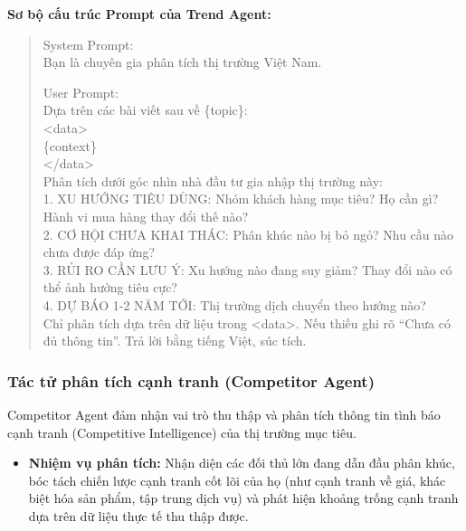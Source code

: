\documentclass[11pt,a4paper]{article}
\begin{document}
\begin{itemize}
\noindent\textbf{Sơ bộ cấu trúc Prompt của Trend Agent:}
\begin{quote}
\footnotesize\ttfamily
System Prompt:\\
Bạn là chuyên gia phân tích thị trường Việt Nam.\par
\medskip
User Prompt:\\
Dựa trên các bài viết sau về \{topic\}:\\
\textless{}data\textgreater{}\\
\{context\}\\
\textless{}/data\textgreater{}\\
Phân tích dưới góc nhìn nhà đầu tư gia nhập thị trường này:\\
1. XU HƯỚNG TIÊU DÙNG: Nhóm khách hàng mục tiêu? Họ cần gì? Hành vi mua hàng thay đổi thế nào?\\
2. CƠ HỘI CHƯA KHAI THÁC: Phân khúc nào bị bỏ ngỏ? Nhu cầu nào chưa được đáp ứng?\\
3. RỦI RO CẦN LƯU Ý: Xu hướng nào đang suy giảm? Thay đổi nào có thể ảnh hưởng tiêu cực?\\
4. DỰ BÁO 1-2 NĂM TỚI: Thị trường dịch chuyển theo hướng nào?\\
\medskip
Chỉ phân tích dựa trên dữ liệu trong \textless{}data\textgreater{}. Nếu thiếu ghi rõ ``Chưa có đủ thông tin''. Trả lời bằng tiếng Việt, súc tích.
\end{quote}

\subsubsection{Tác tử phân tích cạnh tranh (Competitor Agent)}
Competitor Agent đảm nhận vai trò thu thập và phân tích thông tin tình báo cạnh tranh (Competitive Intelligence) của thị trường mục tiêu.
\begin{itemize}
    \item \textbf{Nhiệm vụ phân tích:} Nhận diện các đối thủ lớn đang dẫn đầu phân khúc, bóc tách chiến lược cạnh tranh cốt lõi của họ (như cạnh tranh về giá, khác biệt hóa sản phẩm, tập trung dịch vụ) và phát hiện khoảng trống cạnh tranh dựa trên dữ liệu thực tế thu thập được.
\end{itemize}


\end{itemize}
\end{document}
